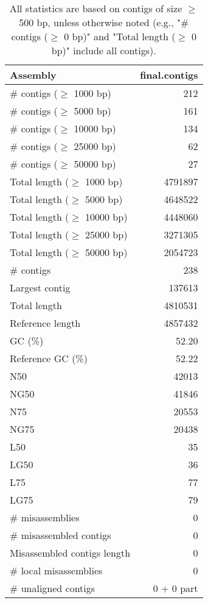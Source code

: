 \documentclass[12pt,a4paper]{article}
\begin{document}
\begin{table}[ht]
\begin{center}
\caption{All statistics are based on contigs of size $\geq$ 500 bp, unless otherwise noted (e.g., "\# contigs ($\geq$ 0 bp)" and "Total length ($\geq$ 0 bp)" include all contigs).}
\begin{tabular}{|l*{1}{|r}|}
\hline
Assembly & final.contigs \\ \hline
\# contigs ($\geq$ 1000 bp) & 212 \\ \hline
\# contigs ($\geq$ 5000 bp) & 161 \\ \hline
\# contigs ($\geq$ 10000 bp) & 134 \\ \hline
\# contigs ($\geq$ 25000 bp) & 62 \\ \hline
\# contigs ($\geq$ 50000 bp) & 27 \\ \hline
Total length ($\geq$ 1000 bp) & 4791897 \\ \hline
Total length ($\geq$ 5000 bp) & 4648522 \\ \hline
Total length ($\geq$ 10000 bp) & 4448060 \\ \hline
Total length ($\geq$ 25000 bp) & 3271305 \\ \hline
Total length ($\geq$ 50000 bp) & 2054723 \\ \hline
\# contigs & 238 \\ \hline
Largest contig & 137613 \\ \hline
Total length & 4810531 \\ \hline
Reference length & 4857432 \\ \hline
GC (\%) & 52.20 \\ \hline
Reference GC (\%) & 52.22 \\ \hline
N50 & 42013 \\ \hline
NG50 & 41846 \\ \hline
N75 & 20553 \\ \hline
NG75 & 20438 \\ \hline
L50 & 35 \\ \hline
LG50 & 36 \\ \hline
L75 & 77 \\ \hline
LG75 & 79 \\ \hline
\# misassemblies & 0 \\ \hline
\# misassembled contigs & 0 \\ \hline
Misassembled contigs length & 0 \\ \hline
\# local misassemblies & 0 \\ \hline
\# unaligned contigs & 0 + 0 part \\ \hline

\end{tabular}
\end{center}
\end{table}
\end{document}

